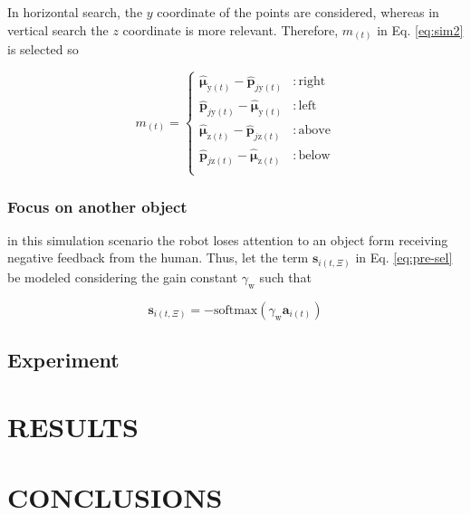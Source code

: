\documentclass[letterpaper, 10 pt, conference]{ieeeconf}  %
\begin{document}
	\noindent In horizontal search, the $y$ coordinate of the points are considered, whereas in vertical search the $z$ coordinate is more relevant. Therefore, $m_{(t)}$ in Eq. \eqref{eq:sim2} is selected so
	
	\begin{equation}
	m_{(t)} = 
	\left\{
	\begin{split}
	\boldsymbol{\hat{\mu}}_{\mathrm{y}(t)}- \mathbf{\hat{p}}_{j\mathrm{y}(t)} & : \mathrm{right}\\
	\mathbf{\hat{p}}_{j\mathrm{y}(t)} - \boldsymbol{\hat{\mu}}_{\mathrm{y}(t)}& : \mathrm{left}\\
	\boldsymbol{\hat{\mu}}_{\mathrm{z}(t)}- \mathbf{\hat{p}}_{j\mathrm{z}(t)} & : \mathrm{above}\\
	\mathbf{\hat{p}}_{j\mathrm{z}(t)} - \boldsymbol{\hat{\mu}}_{\mathrm{z}(t)} & : \mathrm{below}\\
	\end{split}\right.
	\label{eq:sim2-m}
	\end{equation}
	
	\subsubsection{Focus on another object} in this simulation scenario the robot loses attention to an object form receiving negative feedback from the human. Thus, let the term $\mathbf{s}_{i(t,\Xi)}$ in Eq. \eqref{eq:pre-sel} be modeled considering the gain constant $\gamma_\mathrm{w}$ such that
	
	\begin{equation}
	\mathbf{s}_{i(t,\Xi)} = -\mathrm{softmax}\left(\gamma_\mathrm{w}\mathbf{a}_{i(t)}\right)
	\label{eq:sim3}
	\end{equation}
	
	
	\subsection{Experiment}
	
	\section{RESULTS}
	\label{sec:results}

	\section{CONCLUSIONS}
	\label{sec:conclusions}
	
\end{document}
